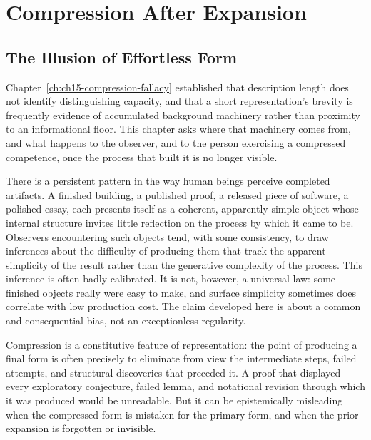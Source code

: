 
\chapter{Compression After Expansion}
\label{ch:ch16-compression-after-expansion}
\section{The Illusion of Effortless Form}

Chapter~\ref{ch:ch15-compression-fallacy} established that description length does not identify distinguishing capacity, and that a short representation's brevity is frequently evidence of accumulated background machinery rather than proximity to an informational floor. This chapter asks where that machinery comes from, and what happens to the observer, and to the person exercising a compressed competence, once the process that built it is no longer visible.

There is a persistent pattern in the way human beings perceive completed artifacts. A finished building, a published proof, a released piece of software, a polished essay, each presents itself as a coherent, apparently simple object whose internal structure invites little reflection on the process by which it came to be. Observers encountering such objects tend, with some consistency, to draw inferences about the difficulty of producing them that track the apparent simplicity of the result rather than the generative complexity of the process. This inference is often badly calibrated. It is not, however, a universal law: some finished objects really were easy to make, and surface simplicity sometimes does correlate with low production cost. The claim developed here is about a common and consequential bias, not an exceptionless regularity.

Compression is a constitutive feature of representation: the point of producing a final form is often precisely to eliminate from view the intermediate steps, failed attempts, and structural discoveries that preceded it. A proof that displayed every exploratory conjecture, failed lemma, and notational revision through which it was produced would be unreadable. But it can be epistemically misleading when the compressed form is mistaken for the primary form, and when the prior expansion is forgotten or invisible.

